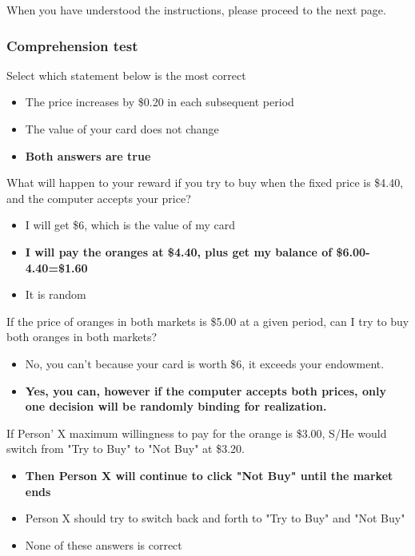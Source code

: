 \documentclass[12pt]{article}
\begin{document}
When you have understood the instructions, please proceed to the next page.
\clearpage

\subsubsection*{Comprehension test}

Select which statement below is the most correct

\begin{itemize}
    \item The price increases by \$0.20 in each subsequent period 
    \item The value of your card does not change
    \item \textbf{Both answers are true}
\end{itemize}

\vspace{0.5cm}

What will happen to your reward if you try to buy when the fixed price is \$4.40, and the computer accepts your price?

\begin{itemize}
    \item I will get \$6, which is the value of my card
    \item \textbf{I will pay the oranges at \$4.40, plus get my balance of \$6.00-4.40=\$1.60}
    \item It is random
\end{itemize}

\vspace{0.5cm}


If the price of oranges in both markets is \$5.00 at a given period, can I try to buy both oranges in both markets?

\begin{itemize}
    \item No, you can’t because your card is worth \$6, it exceeds your endowment.
    \item \textbf{Yes, you can, however if the computer accepts both prices, only one decision will be randomly binding for realization.}
\end{itemize}

\vspace{0.5cm}

If Person' X maximum willingness to pay for the orange is \$3.00, S/He would switch from "Try to Buy" to "Not Buy" at \$3.20.

\begin{itemize}
    \item \textbf{Then Person X will continue to click "Not Buy" until the market ends}
    
    \item Person X should try to switch back and forth to "Try to Buy" and "Not Buy"
    \item None of these answers is correct
\end{itemize}
\end{document}
